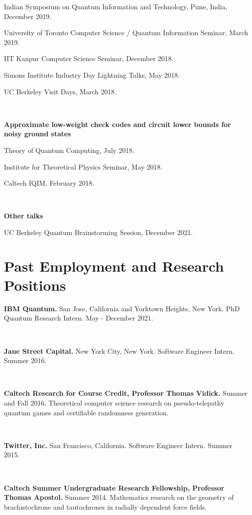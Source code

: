 \documentclass[11pt]{article}
\begin{document}
Indian Symposium on Quantum Information and Technology, Pune, India, December 2019.

University of Toronto Computer Science / Quantum Information Seminar, March 2019.

IIT Kanpur Computer Science Seminar, December 2018.

Simons Institute Industry Day Lightning Talks, May 2018.

UC Berkeley Visit Days, March 2018.

\

\textbf{Approximate low-weight check codes and circuit lower bounds for noisy ground states}

Theory of Quantum Computing, July 2018.

Institute for Theoretical Physics Seminar, May 2018.

Caltech IQIM, February 2018.

\

\textbf{Other talks}

UC Berkeley Quantum Brainstorming Session, December 2021.







\section{Past Employment and Research Positions}

\textbf{IBM Quantum.}
San Jose, California and Yorktown Heights, New York. PhD Quantum Research Intern. May - December 2021.

\

\textbf{Jane Street Capital.}
New York City, New York. Software Engineer Intern. Summer 2016. 

\

\textbf{Caltech Research for Course Credit, Professor Thomas Vidick.}
Summer and Fall 2016. Theoretical computer science research on pseudo-telepathy quantum games and certifiable randomness generation. 

\

\textbf{Twitter, Inc.}
San Francisco, California. Software Engineer Intern. Summer 2015. 

\	

\textbf{Caltech Summer Undergraduate Research Fellowship, Professor Thomas Apostol.}
Summer 2014. Mathematics research on the geometry of brachistochrone and tautochrones in radially dependent force fields. 
\end{document}
